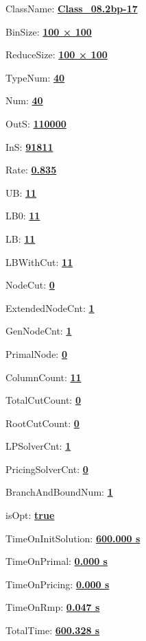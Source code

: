 \documentclass[11pt]{article}
\begin{document}
\pagestyle{empty}


ClassName: \underline{\textbf{Class_08.2bp-17}}
\par
BinSize: \underline{\textbf{100 × 100}}
\par
ReduceSize: \underline{\textbf{100 × 100}}
\par
TypeNum: \underline{\textbf{40}}
\par
Num: \underline{\textbf{40}}
\par
OutS: \underline{\textbf{110000}}
\par
InS: \underline{\textbf{91811}}
\par
Rate: \underline{\textbf{0.835}}
\par
UB: \underline{\textbf{11}}
\par
LB0: \underline{\textbf{11}}
\par
LB: \underline{\textbf{11}}
\par
LBWithCut: \underline{\textbf{11}}
\par
NodeCut: \underline{\textbf{0}}
\par
ExtendedNodeCnt: \underline{\textbf{1}}
\par
GenNodeCnt: \underline{\textbf{1}}
\par
PrimalNode: \underline{\textbf{0}}
\par
ColumnCount: \underline{\textbf{11}}
\par
TotalCutCount: \underline{\textbf{0}}
\par
RootCutCount: \underline{\textbf{0}}
\par
LPSolverCnt: \underline{\textbf{1}}
\par
PricingSolverCnt: \underline{\textbf{0}}
\par
BranchAndBoundNum: \underline{\textbf{1}}
\par
isOpt: \underline{\textbf{true}}
\par
TimeOnInitSolution: \underline{\textbf{600.000 s}}
\par
TimeOnPrimal: \underline{\textbf{0.000 s}}
\par
TimeOnPricing: \underline{\textbf{0.000 s}}
\par
TimeOnRmp: \underline{\textbf{0.047 s}}
\par
TotalTime: \underline{\textbf{600.328 s}}
\par
\newpage


\end{document}
